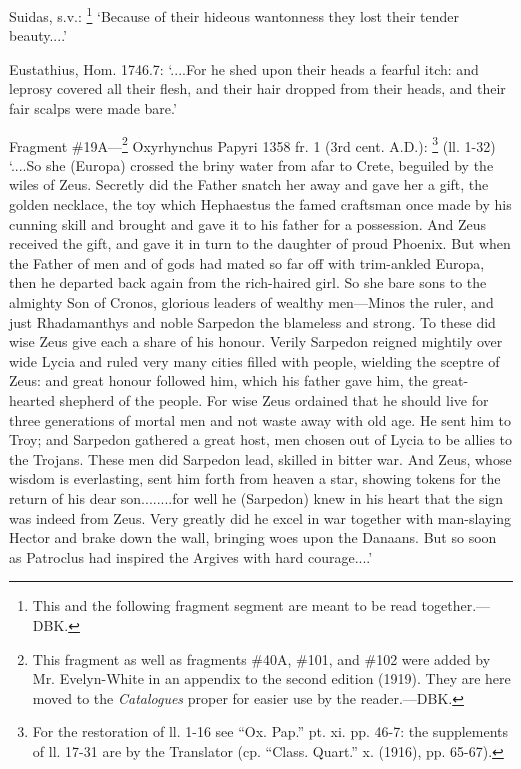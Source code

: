 Suidas, s.v.: \footnote{This and the following
fragment segment are meant to be read together.—DBK.} ‘Because of their hideous
wantonness they lost their tender beauty....’

Eustathius, Hom. 1746.7: ‘....For he shed upon their heads a fearful
itch: and leprosy covered all their flesh, and their hair dropped from their
heads, and their fair scalps were made bare.’

Fragment \#19A—\footnote{This fragment as well as
fragments \#40A, \#101, and \#102 were added by Mr. Evelyn-White in an appendix to
the second edition (1919). They are here moved to the \emph{Catalogues}
proper for easier use by the reader.—DBK.} Oxyrhynchus Papyri 1358 fr. 1
(3rd cent. A.D.): \footnote{For the restoration of ll.
1-16 see “Ox. Pap.” pt. xi. pp. 46-7: the supplements of ll. 17-31
are by the Translator (cp. “Class. Quart.” x. (1916), pp. 65-67).} (ll. 1-32) ‘....So she
(Europa) crossed the briny water from afar to Crete, beguiled by the wiles of
Zeus. Secretly did the Father snatch her away and gave her a gift, the golden
necklace, the toy which Hephaestus the famed craftsman once made by his cunning
skill and brought and gave it to his father for a possession. And Zeus received
the gift, and gave it in turn to the daughter of proud Phoenix. But when the
Father of men and of gods had mated so far off with trim-ankled Europa, then he
departed back again from the rich-haired girl. So she bare sons to the almighty
Son of Cronos, glorious leaders of wealthy men—Minos the ruler, and just
Rhadamanthys and noble Sarpedon the blameless and strong. To these did wise
Zeus give each a share of his honour. Verily Sarpedon reigned mightily over
wide Lycia and ruled very many cities filled with people, wielding the sceptre
of Zeus: and great honour followed him, which his father gave him, the
great-hearted shepherd of the people. For wise Zeus ordained that he should
live for three generations of mortal men and not waste away with old age. He
sent him to Troy; and Sarpedon gathered a great host, men chosen out of Lycia
to be allies to the Trojans. These men did Sarpedon lead, skilled in bitter
war. And Zeus, whose wisdom is everlasting, sent him forth from heaven a star,
showing tokens for the return of his dear son........for well he (Sarpedon)
knew in his heart that the sign was indeed from Zeus. Very greatly did he excel
in war together with man-slaying Hector and brake down the wall, bringing woes
upon the Danaans. But so soon as Patroclus had inspired the Argives with hard
courage....’

